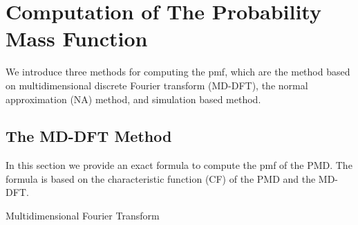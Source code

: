 \documentclass[12pt]{article}
\begin{document}
\section{Computation of The Probability Mass Function}\label{sec:CA.driving.study}
We introduce three methods for computing the pmf, which are the method based on multidimensional discrete Fourier transform (MD-DFT), the normal approximation (NA) method, and simulation based method.

\subsection{The MD-DFT Method}
In this section we provide an exact formula to compute the pmf of the PMD. The formula is based on the characteristic function (CF) of the PMD and the MD-DFT.

Multidimensional Fourier Transform
\end{document}
